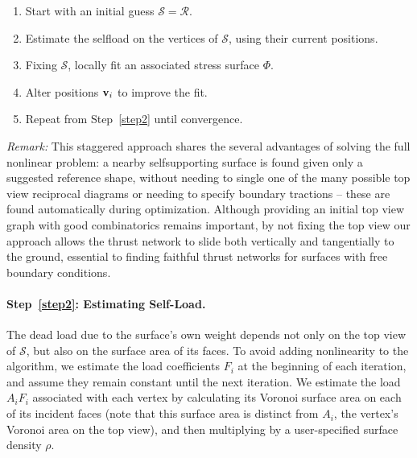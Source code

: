 \documentclass[review]{acmsiggraph}
\def\SS{{\mathcal S}}
\def\RR{{\mathcal R}}
\begin{document}
\begin{enumerate}\itemsep-\parsep\setcounter{enumi}{-1}

\item Start with an initial guess $\SS = \RR$.

\item \label{step2} Estimate the self\dash load on the vertices of $\SS$,
using their current positions.

\item \label{step3} Fixing $\SS$, locally fit an associated stress surface $\Phi$.

\item \label{step4} Alter positions ${\mathbf v}_i$ to improve the fit.

\item Repeat from Step~\ref{step2} until convergence.

\end{enumerate}

{\it Remark:} This staggered approach shares the several advantages of
solving the full nonlinear problem: a nearby self\dash supporting surface
is found given only a suggested reference shape, without needing to single
one of the many possible top view reciprocal diagrams or needing to
specify boundary tractions -- these are found automatically during
optimization. Although providing an initial top view graph with good
combinatorics remains important, by not fixing the top view our approach
allows the thrust network to slide both vertically and tangentially to the
ground, essential to finding faithful thrust networks for surfaces with
free boundary conditions.

\paragraph{Step~\ref{step2}: Estimating Self-Load.}

The dead load due to the surface's own weight depends not only on the top
view of $\SS$, but also on the surface area of its faces. To avoid adding
nonlinearity to the algorithm, we estimate the load coefficients $F_i$ at
the beginning of each iteration, and assume they remain constant until the
next iteration. We estimate the load $A_iF_i$ associated with each
vertex by calculating its Voronoi surface area on each of its incident faces
(note that this surface area is distinct from $A_i$, the vertex's Voronoi
area on the top view), and then multiplying by a user-specified surface density $\rho$.
\end{document}
